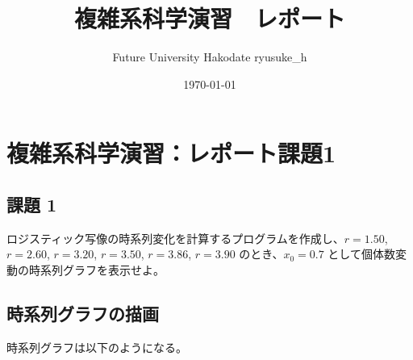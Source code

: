 \documentclass[a4j]{jsarticle}
\title{複雑系科学演習　レポート}
\author{Future University Hakodate ryusuke_h}
\date{\today}
\begin{document}
\maketitle
\tableofcontents %

\newpage

\section{複雑系科学演習：レポート課題1}

\subsection{課題 1}
  ロジスティック写像の時系列変化を計算するプログラムを作成し、$r = 1.50$, $r = 2.60$, $r = 3.20$, $r = 3.50$, $r = 3.86$, $r = 3.90$ のとき、$x_{0} = 0.7$ として個体数変動の時系列グラフを表示せよ。\\

\subsection{時系列グラフの描画}

時系列グラフは以下のようになる。
\end{document}
